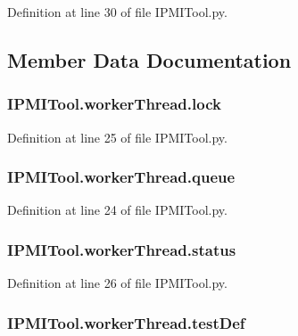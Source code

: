 Definition at line 30 of file I\-P\-M\-I\-Tool.\-py.



\subsection{Member Data Documentation}
\hypertarget{classIPMITool_1_1workerThread_a0c20d3839986d29dff2783bf4bc8920a}{
\subsubsection[{lock}]{\setlength{\rightskip}{0pt plus 5cm}I\-P\-M\-I\-Tool.\-worker\-Thread.\-lock}}\label{classIPMITool_1_1workerThread_a0c20d3839986d29dff2783bf4bc8920a}


Definition at line 25 of file I\-P\-M\-I\-Tool.\-py.

\hypertarget{classIPMITool_1_1workerThread_a023c5663badff1010199d1494c8b3639}{
\subsubsection[{queue}]{\setlength{\rightskip}{0pt plus 5cm}I\-P\-M\-I\-Tool.\-worker\-Thread.\-queue}}\label{classIPMITool_1_1workerThread_a023c5663badff1010199d1494c8b3639}


Definition at line 24 of file I\-P\-M\-I\-Tool.\-py.

\hypertarget{classIPMITool_1_1workerThread_a611bfcde0fa8d328904fde134bde0d87}{
\subsubsection[{status}]{\setlength{\rightskip}{0pt plus 5cm}I\-P\-M\-I\-Tool.\-worker\-Thread.\-status}}\label{classIPMITool_1_1workerThread_a611bfcde0fa8d328904fde134bde0d87}


Definition at line 26 of file I\-P\-M\-I\-Tool.\-py.

\hypertarget{classIPMITool_1_1workerThread_a83638bfbceb196edbfd06990e230cd8e}{
\subsubsection[{test\-Def}]{\setlength{\rightskip}{0pt plus 5cm}I\-P\-M\-I\-Tool.\-worker\-Thread.\-test\-Def}}\label{classIPMITool_1_1workerThread_a83638bfbceb196edbfd06990e230cd8e}


